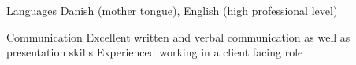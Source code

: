 


\begin{cvskills}


\cvskill
{Languages} %
{Danish (mother tongue), English (high professional level)} %


\cvskill
{Communication} %
{Excellent written and verbal communication as well as presentation skills} %
\cvskill
{} %
{Experienced working in a client facing role} %


\end{cvskills}
